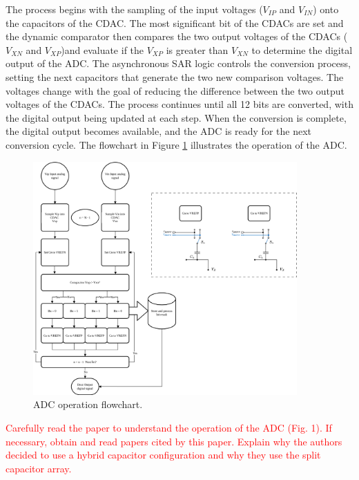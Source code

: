 The process begins with the sampling of the input voltages ($V_{IP}$ and $V_{IN}$) onto the capacitors of the CDAC. The most significant bit of the CDACs are set and the dynamic comparator then compares the two output voltages of the CDACs ($V_{XN}$ and $V_{XP}$)and evaluate if the $V_{XP}$ is greater than $V_{XN}$ to determine the digital output of the ADC. The asynchronous SAR logic controls the conversion process, setting the next capacitors that generate the two new comparison voltages. The voltages change with the goal of reducing the difference between the two output voltages of the CDACs. The process continues until all 12 bits are converted, with the digital output being updated at each step. When the conversion is complete, the digital output becomes available, and the ADC is ready for the next conversion cycle. The flowchart in Figure \ref{fig:ADC-flowchart} illustrates the operation of the ADC.
\begin{figure}[H]
    \centering
    \includegraphics[width=0.9\textwidth]{Images/operation_ADC.png}
    \caption{ADC operation flowchart.}
    \label{fig:ADC-flowchart}
\end{figure}

\textcolor{red}{Carefully read the paper to understand the operation of the ADC (Fig. 1). If necessary, obtain and read papers cited by this paper. Explain why the authors decided to use a hybrid capacitor configuration and why they use the split capacitor array.}